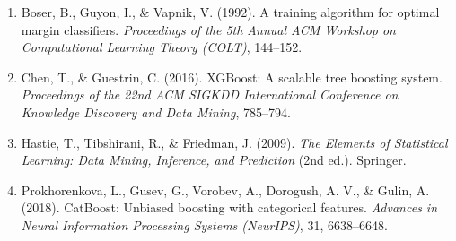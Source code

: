 \documentclass[12pt,a4paper]{article}
\begin{document}
\begin{enumerate}\setlength{\itemsep}{2pt}\setlength{\parskip}{0pt}
  \item Boser, B., Guyon, I., \& Vapnik, V. (1992). A training algorithm for optimal margin classifiers. \textit{Proceedings of the 5th Annual ACM Workshop on Computational Learning Theory (COLT)}, 144--152.
  \item Chen, T., \& Guestrin, C. (2016). XGBoost: A scalable tree boosting system. \textit{Proceedings of the 22nd ACM SIGKDD International Conference on Knowledge Discovery and Data Mining}, 785--794.
  \item Hastie, T., Tibshirani, R., \& Friedman, J. (2009). \textit{The Elements of Statistical Learning: Data Mining, Inference, and Prediction} (2nd ed.). Springer.
  \item Prokhorenkova, L., Gusev, G., Vorobev, A., Dorogush, A. V., \& Gulin, A. (2018). CatBoost: Unbiased boosting with categorical features. \textit{Advances in Neural Information Processing Systems (NeurIPS)}, 31, 6638--6648.
\end{enumerate}
\end{document}
